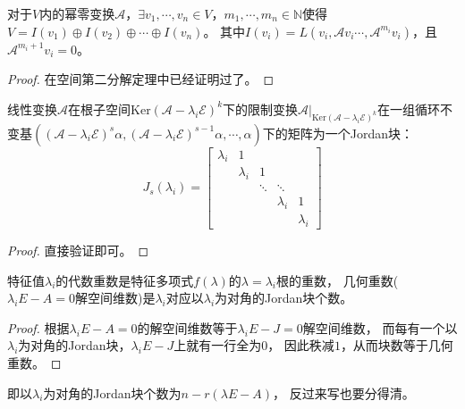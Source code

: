 \begin{theorem}[循环不变子空间分解]
  对于$V$内的幂零变换$\mathcal{A}$，$\exists v_1,\cdots,v_n \in V$，$m_1,\cdots,m_n \in \mathbb{N}$使得$V = I(v_1) \oplus I(v_2) \oplus \cdots \oplus I(v_n)$。
  其中$I(v_i) = L( v_i, \mathcal{A}v_i \cdots, \mathcal{A}^{m_i} v_i)$，且$\mathcal{A}^{m_i + 1} v_i = 0$。
\end{theorem}

\begin{proof}
  在空间第二分解定理中已经证明过了。
\end{proof}

\begin{theorem}[Jordan阵与循环不变子空间]
  线性变换$\mathcal{A}$在根子空间$\mathrm{Ker}(\mathcal{A} - \lambda_i\mathcal{E})^k$下的限制变换$\mathcal{A} \big|_{\mathrm{Ker}(\mathcal{A} - \lambda_i \mathcal{E})^k}$在一组循环不变基$((\mathcal{A} - \lambda_i\mathcal{E})^s\alpha, (\mathcal{A} - \lambda_i \mathcal{E})^{s-1}\alpha,\cdots,\alpha)$下的矩阵为一个Jordan块：
  \begin{equation*}
    J_s(\lambda_i) = \left[
      \begin{array}{ccccc}
        \lambda_i&1&&& \\
                 &\lambda_i&1&&\\ 
                 &&\ddots&\ddots& \\ 
                 &&&\lambda_i&1\\
                 &&&&\lambda_i
      \end{array}
    \right]
  \end{equation*}
\end{theorem}

\begin{proof}
  直接验证即可。
\end{proof}


\begin{theorem}[Jordan阵与几何重数]
  特征值$\lambda_i$的代数重数是特征多项式$f(\lambda)$的$\lambda = \lambda_i$根的重数，
  几何重数($\lambda_i E - A = 0$解空间维数)是$\lambda_i$对应以$\lambda_i$为对角的Jordan块个数。
\end{theorem}

\begin{proof}
  根据$\lambda_i E - A = 0$的解空间维数等于$\lambda_i E - J = 0$解空间维数，
  而每有一个以$\lambda_i$为对角的Jordan块，$\lambda_i E - J$上就有一行全为$0$，
  因此秩减$1$，从而块数等于几何重数。
\end{proof}

\begin{note}
  即以$\lambda_i$为对角的Jordan块个数为$n - r(\lambda E - A)$，
  反过来写也要分得清。
\end{note}


